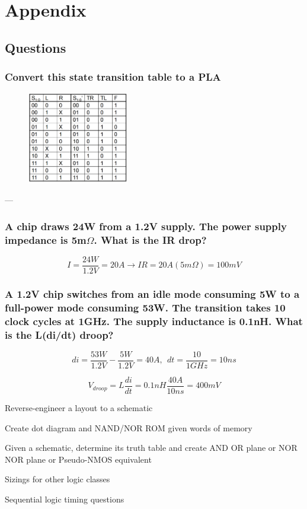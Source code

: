 \documentclass{article}
\renewcommand\appendix{\par
  \setcounter{section}{0}
  \setcounter{subsection}{0}
  \setcounter{figure}{0}
  \setcounter{table}{0}
  \renewcommand\thesection{Appendix \Alph{section}}
  \renewcommand\thefigure{\Alph{section}\arabic{figure}}
  \renewcommand\thetable{\Alph{section}\arabic{table}}
}
\begin{document}

\clearpage
\doublespacing

 
\pagebreak

\appendix
\onehalfspacing
\section*{Appendix}
\renewcommand{\thesubsection}{\Alph{subsection}}

\subsection{Questions}

\subsubsection{Convert this state transition table to a PLA}

\begin{figure}[ht!]
\centering
\includegraphics[height=40mm]{Table.png}
\end{figure}

---

\subsubsection{A chip draws 24W from a 1.2V supply. The power supply impedance is 5m$\Omega$. What is the IR drop?}

$$I = \frac{24W}{1.2V} = 20A \rightarrow IR = 20A (5m\Omega) = 100mV$$

\subsubsection{A 1.2V chip switches from an idle mode consuming 5W to a full-power mode consuming 53W. The transition takes 10 clock cycles at 1GHz. The supply inductance is 0.1nH. What is the L(di/dt) droop?}

$$di = \frac{53W}{1.2V} - \frac{5W}{1.2V} = 40A,\ \ dt = \frac{10}{1GHz} = 10ns$$

$$V_{droop} = L \frac{di}{dt} = 0.1nH \frac{40A}{10ns} = 400mV$$

Reverse-engineer a layout to a schematic

Create dot diagram and NAND/NOR ROM given words of memory

Given a schematic, determine its truth table and create AND OR plane or NOR NOR plane or Pseudo-NMOS equivalent

Sizings for other logic classes

Sequential logic timing questions
\end{document}
